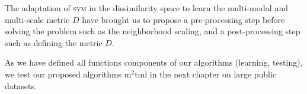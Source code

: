 \noindent The adaptation of \textsc{svm} in the dissimilarity space to learn the multi-modal and multi-scale metric $D$ have brought us to propose a pre-processing step before solving the problem such as the neighborhood scaling, and a post-processing step such as defining the metric $D$.

As we have defined all functions components of our algorithms (learning, testing), we test our proposed algorithms {\sc m}$^2${\sc tml} in the next chapter on large public datasets. 



%
